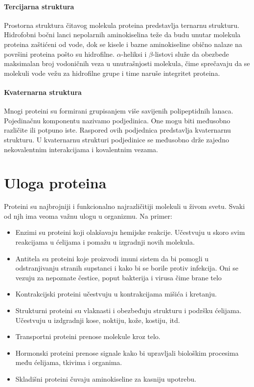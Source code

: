 \paragraph{Tercijarna struktura} 
Prostorna struktura čitavog molekula proteina predstavlja ternarnu strukturu. Hidrofobni bočni lanci nepolarnih aminokiselina teže da budu unutar molekula proteina zaštićeni od vode, dok se kisele i bazne aminokiseline obično nalaze na površini proteina pošto su hidrofilne. $\alpha$-heliksi i $\beta$-listovi služe da obezbede maksimalan broj vodoničnih veza u unutrašnjosti molekula, čime sprečavaju da se molekuli vode vežu za hidrofilne grupe i time naruše integritet proteina. \cite{biochemestry5, biohUdz}


\paragraph{Kvaternarna struktura} Mnogi proteini su formirani grupisanjem više savijenih polipeptidnih lanaca. Pojedinačnu komponentu nazivamo podjedinica. One mogu biti međusobno različite ili potpuno iste. Raspored ovih podjednica predstavlja kvaternarnu strukturu.  U kvaternarnu strukturi podjedinice se međusobno drže zajedno nekovalentnim interakcijama i kovalentnim vezama.  \cite{PSF, doktJK, biochemestry5}


\section{Uloga proteina}


Proteini su najbrojniji i funkcionalno najrazličitiji molekuli u živom svetu. Svaki od njh ima veoma važnu ulogu u organizmu. Na primer:

\begin{itemize}
	\item Enzimi su proteini koji olakšavaju hemijske reakcije. Učestvuju u skoro svim reakcijama u ćelijama i pomažu u izgradnji novih molekula.
	
	\item Antitela su proteini koje proizvodi imuni sistem da bi pomogli u odstranjivanju stranih supstanci i kako bi se borile protiv infekcija. Oni se vezuju za nepoznate čestice, poput bakterija i virusa čime brane telo 
	
	\item Kontrakcijski proteini učestvuju u kontrakcijama mišića i kretanju.
	
	\item Strukturni proteini su vlaknasti i obezbeđuju strukturu i podršku ćelijama. Učestvuju u izdgradnji kose, noktiju, kože, kostiju, itd.
	
	\item Transportni proteini prenose molekule kroz telo.
	
	\item Hormonski proteini prenose signale kako bi upravljali biološkim procesima među ćelijama, tkivima i organima.
	
	\item Skladišni proteini čuvaju aminokiseline za kasniju upotrebu. \cite{fspOnl, roleOnl, nlmOnl}
	
\end{itemize}
 
 

